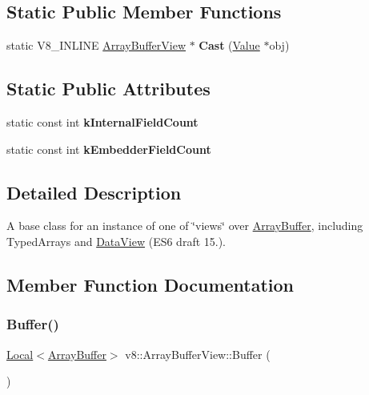 \subsection*{Static Public Member Functions}
\begin{DoxyCompactItemize}
\item 
\mbox{\label{classv8_1_1ArrayBufferView_a84db315fe904ca1421c0e8e3f615cccb}} 
static V8\+\_\+\+I\+N\+L\+I\+NE \mbox{\hyperlink{classv8_1_1ArrayBufferView}{Array\+Buffer\+View}} $\ast$ {\bfseries Cast} (\mbox{\hyperlink{classv8_1_1Value}{Value}} $\ast$obj)
\end{DoxyCompactItemize}
\subsection*{Static Public Attributes}
\begin{DoxyCompactItemize}
\item 
static const int {\bfseries k\+Internal\+Field\+Count}
\item 
static const int {\bfseries k\+Embedder\+Field\+Count}
\end{DoxyCompactItemize}


\subsection{Detailed Description}
A base class for an instance of one of \char`\"{}views\char`\"{} over \mbox{\hyperlink{classv8_1_1ArrayBuffer}{Array\+Buffer}}, including Typed\+Arrays and \mbox{\hyperlink{classv8_1_1DataView}{Data\+View}} (E\+S6 draft 15.). 

\subsection{Member Function Documentation}
\mbox{\label{classv8_1_1ArrayBufferView_a2ceba3908fbf98ecc81702083127b046}} 
\subsubsection{\texorpdfstring{Buffer()}{Buffer()}}
{\footnotesize\ttfamily \mbox{\hyperlink{classv8_1_1Local}{Local}}$<$\mbox{\hyperlink{classv8_1_1ArrayBuffer}{Array\+Buffer}}$>$ v8\+::\+Array\+Buffer\+View\+::\+Buffer (\begin{DoxyParamCaption}{ }\end{DoxyParamCaption})}

